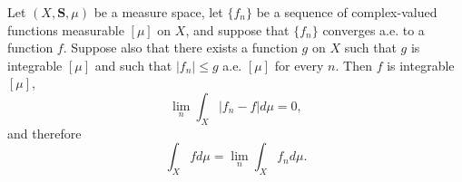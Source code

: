 Let $(X, \mathbf{S}, \mu)$ be a measure space, let $\{f_n\}$ be a sequence of complex-valued functions measurable $[\mu]$ on $X$, and suppose that $\{f_n\}$ converges a.e. to a function $f$. Suppose also that there exists a function $g$ on $X$ such that $g$ is integrable $[\mu]$ and such that $|f_n| \leq g$ a.e. $[\mu]$ for every $n$. Then $f$ is integrable $[\mu]$,
$$\lim_n \int_X |f_n - f| d\mu = 0,$$
and therefore
$$\int_X f d\mu = \lim_n \int_X f_n d\mu.$$
